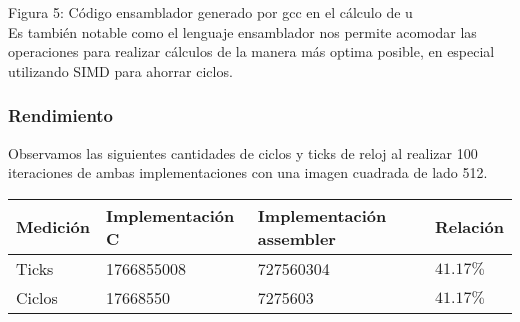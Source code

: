 Figura 5: Código ensamblador generado por gcc en el cálculo de u \\

Es también notable como el lenguaje ensamblador nos permite acomodar las operaciones para realizar cálculos de la manera más optima posible, en especial utilizando SIMD para ahorrar ciclos.

\subsubsection{Rendimiento}
Observamos las siguientes cantidades de ciclos y ticks de reloj al realizar 100 iteraciones de ambas implementaciones con una imagen cuadrada de lado 512.
\begin{center}
    \begin{tabular}{|l|l|l|l|}
        \hline
        Medición & Implementación C & Implementación assembler & Relación \\
        \hline
        Ticks    & 1766855008      & 727560304               & $41.17\%$ \\
        Ciclos   & 17668550       & 7275603                & $41.17\%$ \\
        \hline
    \end{tabular}
\end{center}